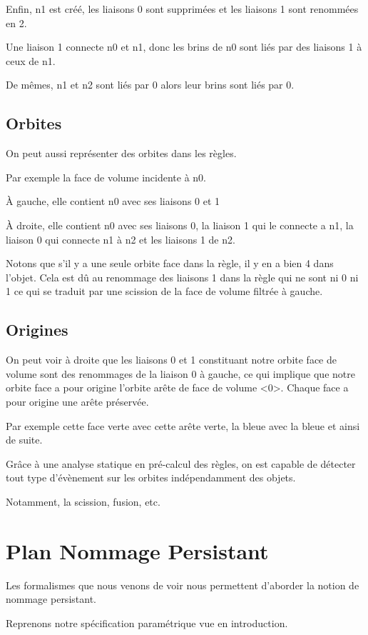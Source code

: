 \documentclass[11pt]{article}
\begin{document}
Enfin, n1 est créé, les liaisons 0 sont supprimées et les liaisons 1 sont
renommées en 2.

Une liaison 1 connecte n0 et n1, donc les brins de n0 sont liés par des
liaisons 1 à ceux de n1.

De mêmes, n1 et n2 sont liés par 0 alors leur brins sont liés par 0.
\subsection{Orbites}
\label{sec:orgcf72bd7}

On peut aussi représenter des orbites dans les règles.

Par exemple la face de volume incidente à n0.

À gauche, elle contient n0 avec ses liaisons 0 et 1

À droite, elle contient n0 avec ses liaisons 0, la liaison 1 qui le connecte a
n1, la liaison 0 qui connecte n1 à n2 et les liaisons 1 de n2.

Notons que s'il y a une seule orbite face dans la règle, il y en a bien 4 dans
l'objet. Cela est dû au renommage des liaisons 1 dans la règle qui ne sont ni 0
ni 1 ce qui se traduit par une scission de la face de volume filtrée à gauche.
\subsection{Origines}
\label{sec:org341560c}

On peut voir à droite que les liaisons 0 et 1 constituant notre orbite face de
volume sont des renommages de la liaison 0 à gauche, ce qui implique que notre
orbite face a pour origine l'orbite arête de face de volume <0>. Chaque face a
pour origine une arête préservée.

Par exemple cette face verte avec cette arête verte, la bleue avec la bleue et
ainsi de suite.

Grâce à une analyse statique en pré-calcul des règles, on est capable de
détecter tout type d'évènement sur les orbites indépendamment des objets.

Notamment, la scission, fusion, etc.
\section{Plan Nommage Persistant}
\label{sec:orgaa5036e}

Les formalismes que nous venons de voir nous permettent d'aborder la notion de
nommage persistant.

Reprenons notre spécification paramétrique vue en introduction.
\end{document}
